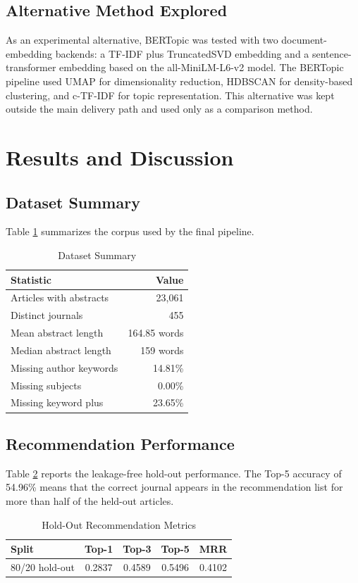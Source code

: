 \documentclass[conference]{IEEEtran}
\begin{document}
\subsection{Alternative Method Explored}
As an experimental alternative, BERTopic was tested with two document-embedding backends: a TF-IDF plus TruncatedSVD embedding and a sentence-transformer embedding based on the all-MiniLM-L6-v2 model. The BERTopic pipeline used UMAP for dimensionality reduction, HDBSCAN for density-based clustering, and c-TF-IDF for topic representation. This alternative was kept outside the main delivery path and used only as a comparison method.

\section{Results and Discussion}
\subsection{Dataset Summary}
Table \ref{tab:dataset} summarizes the corpus used by the final pipeline.

\begin{table}[!t]
\caption{Dataset Summary}
\label{tab:dataset}
\centering
\footnotesize
\begin{tabular}{lr}
\toprule
Statistic & Value \\
\midrule
Articles with abstracts & 23,061 \\
Distinct journals & 455 \\
Mean abstract length & 164.85 words \\
Median abstract length & 159 words \\
Missing author keywords & 14.81\% \\
Missing subjects & 0.00\% \\
Missing keyword plus & 23.65\% \\
\bottomrule
\end{tabular}
\end{table}

\subsection{Recommendation Performance}
Table \ref{tab:metrics} reports the leakage-free hold-out performance. The Top-5 accuracy of 54.96\% means that the correct journal appears in the recommendation list for more than half of the held-out articles.

\begin{table}[!t]
\caption{Hold-Out Recommendation Metrics}
\label{tab:metrics}
\centering
\footnotesize
\begin{tabular}{lcccc}
\toprule
Split & Top-1 & Top-3 & Top-5 & MRR \\
\midrule
80/20 hold-out & 0.2837 & 0.4589 & 0.5496 & 0.4102 \\
\bottomrule
\end{tabular}
\end{table}
\end{document}
